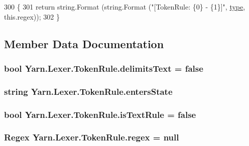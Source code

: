 \begin{DoxyCode}
300             \{
301                 \textcolor{keywordflow}{return} string.Format (string.Format (\textcolor{stringliteral}{"[TokenRule: \{0\} - \{1\}]"}, 
      \hyperlink{a00152_a0de6fac3b55cf0c61e07cea53ce67caa}{type}, this.regex));
302             \}
\end{DoxyCode}


\subsection{Member Data Documentation}
\hypertarget{a00152_ab0849136a1f27b4d13cb7a45e2fe7130}{
\subsubsection[{delimits\-Text}]{\setlength{\rightskip}{0pt plus 5cm}bool Yarn.\-Lexer.\-Token\-Rule.\-delimits\-Text = false}}\label{a00152_ab0849136a1f27b4d13cb7a45e2fe7130}
\hypertarget{a00152_af6a4bd3416c4e1b8e56f9db461d52d18}{
\subsubsection[{enters\-State}]{\setlength{\rightskip}{0pt plus 5cm}string Yarn.\-Lexer.\-Token\-Rule.\-enters\-State}}\label{a00152_af6a4bd3416c4e1b8e56f9db461d52d18}
\hypertarget{a00152_a09f49e6edf9ace38a92d723998181f8f}{
\subsubsection[{is\-Text\-Rule}]{\setlength{\rightskip}{0pt plus 5cm}bool Yarn.\-Lexer.\-Token\-Rule.\-is\-Text\-Rule = false}}\label{a00152_a09f49e6edf9ace38a92d723998181f8f}
\hypertarget{a00152_a47a404d6637fae489c3c77729a01cc69}{
\subsubsection[{regex}]{\setlength{\rightskip}{0pt plus 5cm}Regex Yarn.\-Lexer.\-Token\-Rule.\-regex = null}}\label{a00152_a47a404d6637fae489c3c77729a01cc69}
